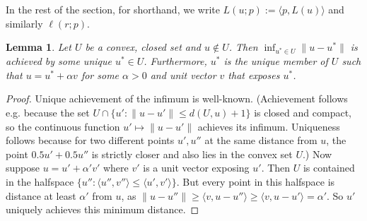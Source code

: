 \documentclass[12pt]{article}
\newtheorem{lemma}{Lemma}
\begin{document}
In the rest of the section, for shorthand, we write $L(u;p) := \langle p, L(u) \rangle$ and similarly $\ell(r;p)$.

\begin{lemma} \label{lemma:exposed-shortest}
  Let $U$ be a convex, closed set and $u \not\in U$.
  Then $\inf_{u^* \in U} \|u-u^*\|$ is achieved by some unique $u^* \in U$.
  Furthermore, $u^*$ is the unique member of $U$ such that $u = u^* + \alpha v$ for some $\alpha > 0$ and unit vector $v$ that exposes $u^*$.
\end{lemma}
\begin{proof}
  Unique achievement of the infimum is well-known.
  (Achievement follows e.g. because the set $U \cap \{u' : \|u - u'\| \leq d(U,u) + 1\}$ is closed and compact, so the continuous function $u' \mapsto \|u-u'\|$ achieves its infimum.
  Uniqueness follows because for two different points $u',u''$ at the same distance from $u$, the point $0.5u' + 0.5u''$ is strictly closer and also lies in the convex set $U$.)
  Now suppose $u = u' + \alpha' v'$ where $v'$ is a unit vector exposing $u'$.
  Then $U$ is contained in the halfspace $\{u'': \langle u'', v'' \rangle \leq \langle u',v' \rangle \}$.
  But every point in this halfspace is distance at least $\alpha'$ from $u$, as $\|u-u''\| \geq \langle v, u - u'' \rangle \geq \langle v, u-u'\rangle = \alpha'$.
  So $u'$ uniquely achieves this minimum distance.
\end{proof}
\end{document}
